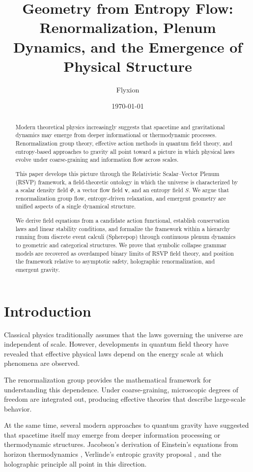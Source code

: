 \documentclass[12pt,a4paper]{article}
\title{Geometry from Entropy Flow:\\
Renormalization, Plenum Dynamics, and the Emergence of Physical Structure}
\author{Flyxion}
\date{\today}
\theoremstyle{plain}
\theoremstyle{definition}
\theoremstyle{remark}
\begin{document}
\maketitle

\begin{abstract}
Modern theoretical physics increasingly suggests that spacetime and
gravitational dynamics may emerge from deeper informational or
thermodynamic processes. Renormalization group theory, effective action
methods in quantum field theory, and entropy-based approaches to gravity
all point toward a picture in which physical laws evolve under
coarse-graining and information flow across scales.

This paper develops this picture through the Relativistic
Scalar--Vector Plenum (RSVP) framework, a field-theoretic ontology in
which the universe is characterized by a scalar density field $\Phi$,
a vector flow field $\mathbf{v}$, and an entropy field $S$. We argue
that renormalization group flow, entropy-driven relaxation, and emergent
geometry are unified aspects of a single dynamical structure.

We derive field equations from a candidate action functional, establish
conservation laws and linear stability conditions, and formalize the
framework within a hierarchy running from discrete event calculi
(Spherepop) through continuous plenum dynamics to geometric and
categorical structures. We prove that symbolic collapse grammar models
are recovered as overdamped binary limits of RSVP field theory, and
position the framework relative to asymptotic safety, holographic
renormalization, and emergent gravity.
\end{abstract}

\newpage

\section{Introduction}

Classical physics traditionally assumes that the laws governing the
universe are independent of scale. However, developments in quantum
field theory have revealed that effective physical laws depend on the
energy scale at which phenomena are observed.

The renormalization group provides the mathematical framework for
understanding this dependence. Under coarse-graining, microscopic
degrees of freedom are integrated out, producing effective theories
that describe large-scale behavior.

At the same time, several modern approaches to quantum gravity have
suggested that spacetime itself may emerge from deeper information
processing or thermodynamic structures. Jacobson's derivation of
Einstein's equations from horizon thermodynamics \cite{Jacobson1995},
Verlinde's entropic gravity proposal \cite{Verlinde2011}, and the
holographic principle \cite{tHooft1993,Susskind1995} all point in
this direction.
\end{document}
